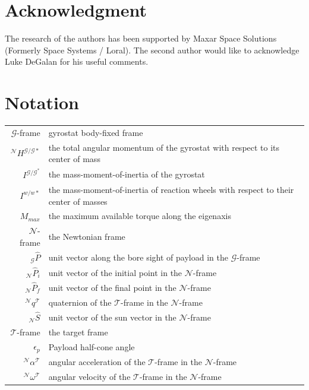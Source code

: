 \documentclass[letterpaper, preprint, paper,11pt]{AAS}	%
\begin{document}
	\section{Acknowledgment}
	The research of the authors has been supported by Maxar Space Solutions (Formerly Space Systems / Loral). The second author would like to acknowledge Luke DeGalan for his useful comments.
	\section{Notation}
\begin{tabular}{r l}
$\mathcal{G}$-frame& gyrostat body-fixed frame\\
$^\mathcal{N}H^{\mathcal{G/G*}}$& the total angular momentum of the gyrostat with respect to its center of mass\\
$I^{\mathcal{G/G^*}}$ &the mass-moment-of-inertia of the gyrostat\\
$I^{w/w*}$ & the mass-moment-of-inertia of reaction wheels with respect to their center of masses\\
$M_{max}$ & the maximum available torque along the eigenaxis\\
$\mathcal{N}$-frame & the Newtonian frame \\


$_\mathcal{G}\hat{P}$ & unit vector along the bore sight of payload in the $\mathcal{G}$-frame\\
$_\mathcal{N}\hat{P}_i$ & unit vector of the initial point in the $\mathcal{N}$-frame\\
$_\mathcal{N}\hat{P}_f$ & unit vector of the final point in the $\mathcal{N}$-frame\\

$^\mathcal{N}q^\mathcal{T}$& quaternion of the $\mathcal{T}$-frame in the $\mathcal{N}$-frame\\
$_\mathcal{N}\hat{S}$ & unit vector of the sun vector in the $\mathcal{N}$-frame\\
$\mathcal{T}$-frame & the target frame \\
$\epsilon_p$ & Payload half-cone angle\\
$^\mathcal{N}\alpha^\mathcal{T}$& angular acceleration of the $\mathcal{T}$-frame in the $\mathcal{N}$-frame\\
$^\mathcal{N}\omega^\mathcal{T}$& angular velocity of the $\mathcal{T}$-frame in the $\mathcal{N}$-frame\\

\end{tabular} \\

	
	
	
	
\end{document}
